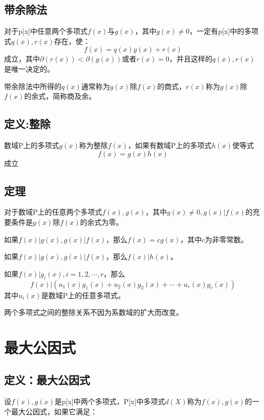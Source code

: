 \documentclass{article}%
\begin{document}
\subsection{带余除法}
 对于p[x]中任意两个多项式$f(x)$与$g(x)$，其中$g(x)\ne0$，一定有p[x]中的多项式$q(x),r(x)$存在，使：
 \begin{equation*}
 	f(x)=q(x)g(x)+r(x)
 \end{equation*}
成立，其中$\partial(r(x))<\partial(g(x))$或者$r(x)=0$，并且这样的$q(x),r(x)$是唯一决定的。
\\ \hspace*{\fill} 

带余除法中所得的$q(x)$通常称为$g(x)$除$f(x)$的商式，$r(x)$称为$g(x)$除$f(x)$的余式，简称商及余。
\subsection{定义:整除}
数域P上的多项式$g(x)$称为整除$f(x)$，如果有数域P上的多项式$h(x)$使等式
\begin{equation*}
	f(x)=g(x)h(x)
\end{equation*}
成立
\subsection{定理}
对于数域P上的任意两个多项式$f(x),g(x)$，其中$g(x)\ne0,g(x)|f(x)$的充要条件是$g(x)$除$f(x)$的余式为零。
\\ \hspace*{\fill}

如果$f(x)|g(x),g(x)|f(x)$，那么$f(x)=cg(x)$，其中c为非零常数。
\\ \hspace*{\fill}

如果$f(x)|g(x),g(x)|f(x)$，那么$f(x)|h(x)$。
\\ \hspace*{\fill}

如果$f(x)|g_i(x),i=1,2,\cdots,r$，那么
\[
f(x)|(u_1(x)g_1(x)+u_2(x)g_2(x)+\cdots+u_r(x)g_r(x))
\]
其中$u_i(x)$是数域P上的任意多项式。
\\ \hspace*{\fill}

两个多项式之间的整除关系不因为系数域的扩大而改变。
\section{最大公因式}
\subsection{定义：最大公因式}
设$f(x),g(x)$是p[x]中两个多项式，P[x]中多项式$d(X)$称为$f(x),g(x)$的一个最大公因式，如果它满足：
\end{document}
